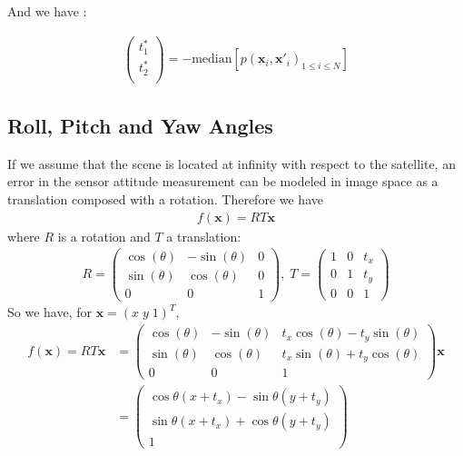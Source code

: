 \documentclass[paper=a4, fontsize=11pt]{article}
\begin{document}
And we have : 

\begin{align*}
\begin{pmatrix} 
t_1^* \\
t_2^* \\
\end{pmatrix} = -\text{median}\left[ p(\textbf{x}_i, \textbf{x}'_i)_{1 \leq i \leq N} \right]
\end{align*}



\subsection{Roll, Pitch and Yaw Angles}
If we assume that the scene is located at infinity with respect to the satellite, an error in the sensor attitude measurement can be modeled in image space as a translation composed with a rotation. Therefore we have
\begin{align*}
f(\textbf{x}) = RT\textbf{x}
\end{align*}
where $R$ is a rotation and $T$ a translation:\\
\begin{align*} 
R = 
\begin{pmatrix} 
\cos(\theta) & -\sin(\theta) & 0 \\
\sin(\theta) & \cos(\theta) & 0 \\
0 & 0 & 1
\end{pmatrix}, \; 
T = 
\begin{pmatrix} 
1 & 0 & t_x \\
0 & 1 & t_y \\
0 & 0 & 1
\end{pmatrix}
\end{align*}
So we have, for $ \textbf{x} = (  x \; y \; 1)^T $, 
\begin{align*}
f(\textbf{x}) = RT\textbf{x} &= 
\begin{pmatrix} 
\cos(\theta) & -\sin(\theta) & t_x\cos(\theta) - t_y\sin(\theta)  \\
\sin(\theta) & \cos(\theta) & t_x\sin(\theta) + t_y\cos(\theta)  \\
0 & 0 & 1
\end{pmatrix} \textbf{x}  \\
&= 
		\begin{pmatrix}
			\cos \theta (x + t_x) - \sin \theta (y + t_y)\\
			\sin \theta (x + t_x) + \cos \theta (y + t_y)\\
			1
		\end{pmatrix}
\end{align*}
\end{document}
